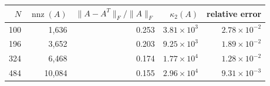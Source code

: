 \begin{tabular}{rrrrr}
\toprule
$N$ & $\operatorname{nnz}(A)$ & $\|A-A^T\|_F/\|A\|_F$ & $\kappa_2(A)$ & relative error \\
\midrule
100 & 1,636  & 0.253 & $3.81\times10^3$ & $2.78\times10^{-2}$ \\
196 & 3,652  & 0.203 & $9.25\times10^3$ & $1.89\times10^{-2}$ \\
324 & 6,468  & 0.174 & $1.77\times10^4$ & $1.28\times10^{-2}$ \\
484 & 10,084 & 0.155 & $2.96\times10^4$ & $9.31\times10^{-3}$ \\
\bottomrule
\end{tabular}
